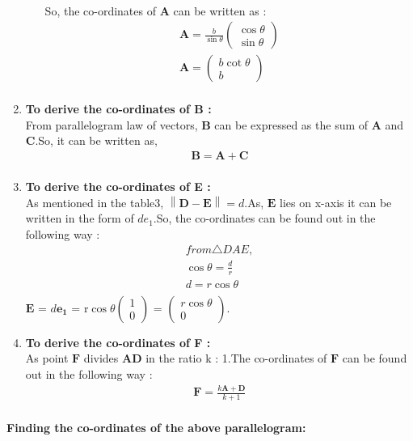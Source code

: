 \documentclass{article}
\providecommand{\norm}[1]{\left\lVert#1\right\rVert}
\newcommand{\myvec}[1]{\ensuremath{\begin{pmatrix}#1\end{pmatrix}}}
\let\vec\mathbf
\begin{document}
\begin{enumerate}
\begin{enumerate}
\begin{align}
		\end{align}
		So, the co-ordinates of $\vec{A}$ can be written as :\\
		\begin{align}
			\vec{A} = \frac{b}{\sin{\theta}}\myvec{\cos{\theta}\\\sin{\theta}}\\
			\vec{A} = \myvec{b\cot{\theta}\\b}\\
		\end{align}
		\end{enumerate}
	\item \textbf{To derive the co-ordinates of B :}\\
		From parallelogram law of vectors, $\vec{B}$ can be expressed as the sum of $\vec{A}$ and $\vec{C}$.So, it can be written as,\\
		\begin{align}
			\vec{B} = \vec{A} + \vec{C}\\
		\end{align}
	\item \textbf{To derive the co-ordinates of E :}\\
		As mentioned in the table3, $\norm{\vec{D} - \vec{E}} = d$.As, $\vec{E}$ lies on x-axis it can be written in the form of $de_1$.So, the co-ordinates can be found out in the following way : \\
		\begin{align}
			from \triangle{DAE},\\
			\cos{\theta} = \frac{d}{r}\\
			d = r\cos{\theta}\\
		\end{align}
		 $\vec{E}$ = $d\vec{e_1}$ = r$\cos{\theta}\myvec{1\\0}$ = $\myvec{r\cos{\theta}\\0}$.\\
	 \item \textbf{To derive the co-ordinates of F :}\\
		 As point $\vec{F}$ divides $\vec{AD}$ in the ratio k : 1.The co-ordinates of $\vec{F}$ can be found out in the following way : \\
		 \begin{align}
			 \vec{F} = \frac{k\vec{A} + \vec{D}}{k + 1}\\
		 \end{align}
\end{enumerate}
\textbf{Finding the co-ordinates of the above parallelogram:}\\
\end{document}
